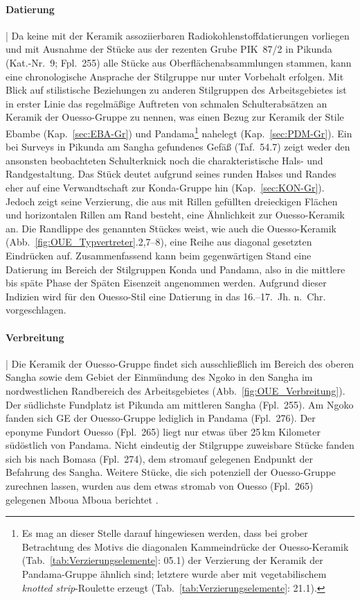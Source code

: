 \paragraph{Datierung}\hspace{-.5em}|\hspace{.5em}%
Da keine mit der Keramik assoziierbaren Radiokohlenstoffdatierungen vorliegen und mit Ausnahme der Stücke aus der rezenten Grube PIK~87/2 in Pikunda (Kat.-Nr.~9; Fpl.~255) alle Stücke aus Oberflächenabsammlungen stammen, kann eine chronologische Ansprache der Stilgruppe nur unter Vorbehalt erfolgen. Mit Blick auf stilistische Beziehungen zu anderen Stilgruppen des Arbeitsgebietes ist in erster Linie das regelmäßige Auftreten von schmalen Schulterabsätzen an Keramik der Ouesso-Gruppe zu nennen, was einen Bezug zur Keramik der Stile Ebambe (Kap.~\ref{sec:EBA-Gr}) und Pandama\footnote{Es mag an dieser Stelle darauf hingewiesen werden, dass bei grober Betrachtung des Motivs die diagonalen Kammeindrücke der Ouesso-Keramik (Tab.~\ref{tab:Verzierungselemente}: 05.1) der Verzierung der Keramik der Pandama-Gruppe ähnlich sind; letztere wurde aber mit vegetabilischem \textit{knotted strip}-Roulette erzeugt (Tab.~\ref{tab:Verzierungselemente}: 21.1).} nahelegt (Kap.~\ref{sec:PDM-Gr}). Ein bei Surveys in Pikunda am \mbox{Sangha} gefundenes Gefäß (Taf.~54.7) zeigt weder den ansonsten beobachteten Schulterknick noch die charakteristische Hals- und Randgestaltung. Das Stück deutet aufgrund seines runden Halses und Randes eher auf eine Verwandtschaft zur Konda-Gruppe hin (Kap.~\ref{sec:KON-Gr}). Jedoch zeigt seine Verzierung, die aus mit Rillen gefüllten dreieckigen Flächen und horizontalen Rillen am Rand besteht, eine Ähnlichkeit zur Ouesso-Keramik an. Die Randlippe des genannten Stückes weist, wie auch die Ouesso-Keramik (Abb.~\ref{fig:OUE_Typvertreter}.2,7--8), eine Reihe aus diagonal gesetzten Eindrücken auf. Zusammenfassend kann beim gegenwärtigen Stand eine Datierung im Bereich der Stilgruppen Konda und Pandama, also in die mittlere bis späte Phase der Späten Eisenzeit angenommen werden. Aufgrund dieser Indizien wird für den Ouesso-Stil eine Datierung in das 16.--17.~Jh. n.~Chr. vorgeschlagen.

\paragraph{Verbreitung}\hspace{-.5em}|\hspace{.5em}%
Die Keramik der Ouesso-Gruppe findet sich ausschließlich im Bereich des oberen \mbox{Sangha} sowie dem Gebiet der Einmündung des \mbox{Ngoko} in den \mbox{Sangha} im nordwestlichen Randbereich des Arbeitsgebietes (Abb.~\ref{fig:OUE_Verbreitung}). Der südlichste Fundplatz ist Pikunda am mittleren \mbox{Sangha} (Fpl.~255). Am \mbox{Ngoko} fanden sich GE der Ouesso-Gruppe lediglich in Pandama (Fpl.~276). Der eponyme Fundort Ouesso (Fpl.~265) liegt nur etwas über 25\,km Kilometer südöstlich von Pandama. Nicht eindeutig der Stilgruppe zuweisbare Stücke fanden sich bis nach Bomasa (Fpl.~274), dem stromauf gelegenen Endpunkt der Befahrung des \mbox{Sangha}. Weitere Stücke, die sich potenziell der Ouesso-Gruppe zurechnen lassen, wurden aus dem etwas stromab von Ouesso (Fpl.~265) gelegenen Mboua Mboua berichtet \parencite[114 Abb.~42]{Gillet.2013}.